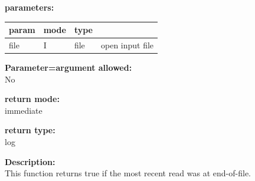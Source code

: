         {\bf parameters:} \\
        \begin{tabular}{| l | l | l | l |}
        \hline
        param  & mode & type & \\
        \hline \hline
        file & I & file & open input file  \\ \hline
        \end{tabular}
        
        {\bf Parameter=argument allowed:} \\
        No
        
        {\bf return mode:} \\
        immediate

        {\bf return type:} \\
        log
        
        {\bf Description:} \\
        This function returns true if the most recent read was at
        end-of-file.


%        
%        
%        
%        
%
%        
%        
 

